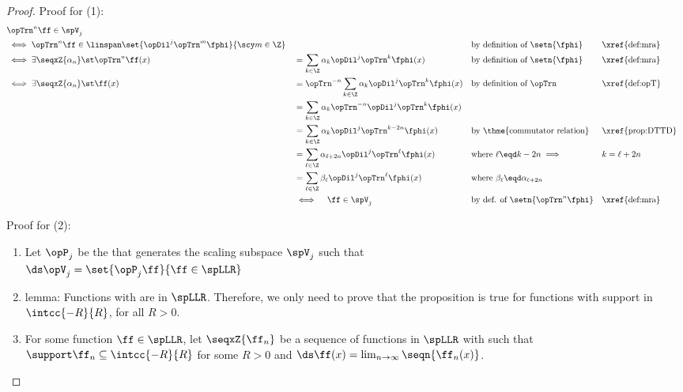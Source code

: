 \begin{proof}
Proof for (1):
\begin{align*}
  &\opTrn^n\ff\in\spV_j
  \\&\iff \opTrn^n\ff\in\linspan\set{\opDil^j\opTrn^m\fphi}{\scy m\in\Z}
          &&
          && \text{by definition of $\setn{\fphi}$} && \text{\xref{def:mra}}
  \\&\iff \exists \seqxZ{\alpha_n} \st \opTrn^n\ff(x)
          &&= \sum_{k\in\Z}\alpha_k\opDil^j\opTrn^k\fphi(x)
          && \text{by definition of $\setn{\fphi}$} && \text{\xref{def:mra}}
  \\&\iff \exists \seqxZ{\alpha_n} \st \ff(x)
          &&= \opTrn^{-n}\sum_{k\in\Z}\alpha_k\opDil^j\opTrn^k\fphi(x)
          && \text{by definition of $\opTrn$} && \text{\xref{def:opT}}
  \\&     &&= \sum_{k\in\Z}\alpha_k\opTrn^{-n}\opDil^j\opTrn^k\fphi(x)
  \\&     &&= \sum_{k\in\Z}\alpha_k\opDil^j\opTrn^{k-2n}\fphi(x)
          && \text{by \thme{commutator relation}} && \text{\xref{prop:DTTD}}
  \\&     &&= \sum_{\ell\in\Z}\alpha_{\ell+2n}\opDil^j\opTrn^{\ell}\fphi(x)
          && \text{where $\ell\eqd k-2n\implies$} &&k=\ell+2n
  \\&     &&= \sum_{\ell\in\Z}\beta_{\ell}\opDil^j\opTrn^{\ell}\fphi(x)
          && \text{where $\beta_{\ell}\eqd\alpha_{\ell+2n}$}
  \\&     &&\iff \quad\ff\in\spV_j
          && \text{by def. of $\setn{\opTrn^n\fphi}$} && \text{\xref{def:mra}}
\end{align*}

Proof for (2):
\begin{enumerate}
  \item Let $\opP_j$ be the  that generates the scaling subspace $\spV_j$ such that \label{idef:mra_glb_Pj}
    \\\indentx$\ds\opV_j=\set{\opP_j\ff}{\ff\in\spLLR}$

  \item lemma: Functions with  are  in $\spLLR$.
        \label{ilem:mra_glb_dense}
        Therefore, we only need to prove that the proposition is true for functions with support in $\intcc{-R}{R}$, for all $R>0$.

  \item For some function $\ff\in\spLLR$, let $\seqxZ{\ff_n}$ be a sequence of functions in $\spLLR$
        with  such that
        \\\indentx
        $\support\ff_n\subseteq\intcc{-R}{R}$ for some $R>0$
        \quad and\quad
        $\ds\ff(x)=\lim_{n\to\infty}\seqn{\ff_n(x)}$.
        \label{idef:mra_glb_ffn}


\end{enumerate}
\end{proof}
